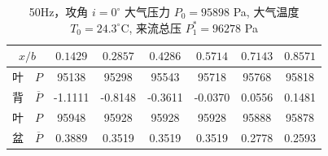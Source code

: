 \begin{table}[H]
  \centering
  \caption[50Hz 攻角 $i=0^\circ$ 实验数据]{50Hz，攻角 $i=0^\circ$ 大气压力 $P_0=95898$ Pa, 大气温度 $T_0=24.3^\circ\text{C}$, 来流总压 $P_1^*=96278$ Pa}
  \label{tab:exp4_50Hz_0}
  \renewcommand{\arraystretch}{1.2}
  \begin{tabular}{cccccccc}
    \toprule
    \multicolumn{2}{c}{$x/b$} & $0.1429$ & $0.2857$ & $0.4286$ & $0.5714$ & $0.7143$ & $0.8571$ \\
    \midrule
    叶 & $P$ & 95138 & 95298 & 95543 & 95718 & 95768 & 95818 \\
    背 & $\overline{P}$ & -1.1111 & -0.8148 & -0.3611 & -0.0370 & 0.0556 & 0.1481 \\
    \midrule
    叶 & $P$ & 95948 & 95928 & 95928 & 95928 & 95888 & 95878 \\
    盆 & $\overline{P}$ & 0.3889 & 0.3519 & 0.3519 & 0.3519 & 0.2778 & 0.2593 \\
    \bottomrule
  \end{tabular}
\end{table}